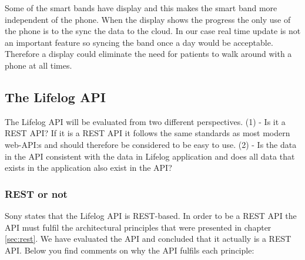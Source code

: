 \documentclass{cslthse-msc}
\begin{document}


Some of the smart bands have display and this makes the smart band more independent of the phone. When the display shows the progress the only use of the phone is to the sync the data to the cloud. In our case real time update is not an important feature so syncing the band once a day would be acceptable. Therefore a display could eliminate the need for patients to walk around with a phone at all times.



\subsection{The Lifelog API}

The Lifelog API will be evaluated from two different perspectives. (1) - Is it a REST API? If it is a REST API it follows the same standards as most modern web-API:s and should therefore be considered to be easy to use. (2) - Is the data in the API consistent with the data in Lifelog application and does all data that exists in the application also exist in the API? 

\subsubsection{REST or not}

Sony states that the Lifelog API is REST-based. In order to be a REST API the API must fulfil the architectural principles that were presented in chapter \ref{sec:rest}. We have evaluated the API and concluded that it actually is a REST API. Below you find comments on why the API fulfils each principle: 
\end{document}
